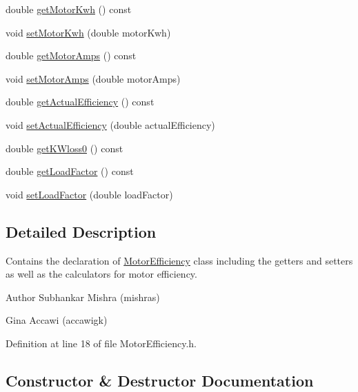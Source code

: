 \begin{DoxyCompactItemize}
\item 
double \hyperlink{class_motor_efficiency_a4d21d0c44ee00f5d097b0acbcb73a8d8}{get\+Motor\+Kwh} () const
\item 
void \hyperlink{class_motor_efficiency_ab1c7507bac259565e43a6777d079148b}{set\+Motor\+Kwh} (double motor\+Kwh)
\item 
double \hyperlink{class_motor_efficiency_a955906509a4b49274b35c1b119c4a4b4}{get\+Motor\+Amps} () const
\item 
void \hyperlink{class_motor_efficiency_ac86aa8d6162e63eb440e07e557534c74}{set\+Motor\+Amps} (double motor\+Amps)
\item 
double \hyperlink{class_motor_efficiency_ae40031307b8631cf40df1c4069069dc0}{get\+Actual\+Efficiency} () const
\item 
void \hyperlink{class_motor_efficiency_a7a5ad8d01fdc0a3bf93d952752487496}{set\+Actual\+Efficiency} (double actual\+Efficiency)
\item 
double \hyperlink{class_motor_efficiency_a47398ac8203f5b79a0ca435673a4bc16}{get\+K\+Wloss0} () const
\item 
double \hyperlink{class_motor_efficiency_abff38d95856c3d33c9c48c45e77e8899}{get\+Load\+Factor} () const
\item 
void \hyperlink{class_motor_efficiency_ad6a7b0eb436378f36ceb8a0cec121786}{set\+Load\+Factor} (double load\+Factor)
\end{DoxyCompactItemize}


\subsection{Detailed Description}
Contains the declaration of \hyperlink{class_motor_efficiency}{Motor\+Efficiency} class including the getters and setters as well as the calculators for motor efficiency. 

\begin{DoxyAuthor}{Author}
Subhankar Mishra (mishras) 

Gina Accawi (accawigk) 
\end{DoxyAuthor}


Definition at line 18 of file Motor\+Efficiency.\+h.



\subsection{Constructor \& Destructor Documentation}
\mbox{\label{class_motor_efficiency_ab8d410693e778a2cb2d5a112cc1a4202}} 
